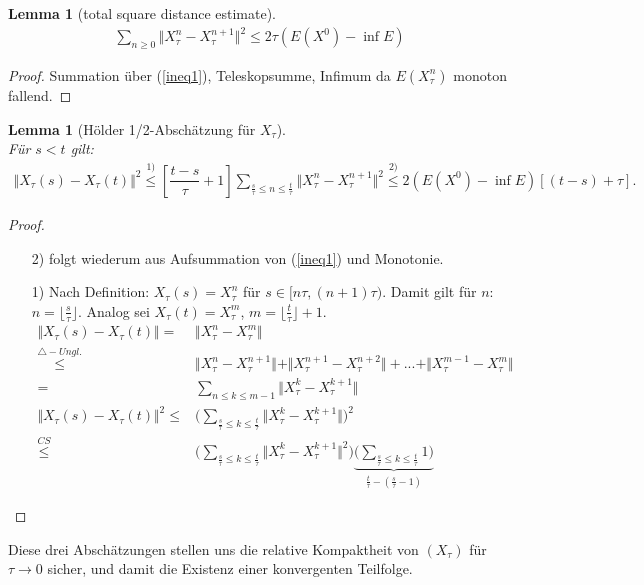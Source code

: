 \documentclass[11pt,a4paper,notitlepage]{scrreprt}
\newtheorem{lem}[defi]{Lemma}
\begin{document}
\begin{lem}[total square distance estimate]
\begin{eqnarray}
\sum_{n\geq 0}\Vert X_\tau^n-X_\tau^{n+1}\Vert^2\leq 2\tau (E(X^0)-\inf E)\label{totalsquare}
\end{eqnarray}
\end{lem}
\begin{proof}
Summation über (\ref{ineq1}), Teleskopsumme, Infimum da $E(X_\tau^n)$ monoton fallend.
\end{proof}

\begin{lem}[Hölder 1/2-Abschätzung für $X_\tau$]  $~~$ \\
Für $s<t$ gilt:
\begin{eqnarray}
\Vert X_\tau(s)-X_\tau(t)\Vert^2 \overset{1)}\leq \left[\dfrac{t-s}{\tau}+1\right] \sum_{\frac{s}{\tau}\leq n \leq \frac{t}{\tau}} \Vert X^n_\tau- X_\tau^{n+1}\Vert^2 \overset{2)}\leq 2(E(X^0)-\inf E)[(t-s)+\tau]. \label{Hölder}
\end{eqnarray}
\end{lem}

\begin{proof}
\begin{itemize}
\item[2)] folgt wiederum aus Aufsummation von (\ref{ineq1}) und Monotonie.
\item[1)] Nach Definition: $X_\tau(s)=X_\tau^n$ für $s\in [n\tau,(n+1)\tau)$. Damit gilt für $n$: $n=\lfloor \frac{s}{	\tau}\rfloor$. Analog sei $X_\tau(t)=X_\tau^m$, $m=\lfloor\frac{t}{\tau}\rfloor+1$.\\
\begin{align*}
\Vert X_\tau(s)-X_\tau(t)\Vert=&\Vert X_\tau^n-X_\tau^m\Vert \\\overset{\triangle -Ungl.}\leq&\Vert X_\tau^n-X_\tau^{n+1}\Vert+\Vert X_\tau^{n+1}-X_\tau^{n+2}\Vert+...+\Vert X_\tau^{m-1}-X_\tau^m\Vert\\
=&\sum_{n\leq k\leq m-1}\Vert X_\tau^k-X_\tau^{k+1}\Vert\\
\Vert X_\tau(s)-X_\tau(t)\Vert^2\leq&\Bigg(\sum_{\frac{s}{\tau}\leq k\leq \frac{t}{\tau}}\Vert X_\tau^k-X_\tau^{k+1}\Vert\Bigg)^2 \\ \overset{CS}\leq&\Bigg(\sum_{\frac{s}{\tau}\leq k\leq \frac{t}{\tau}}\Vert X_\tau^k-X_\tau^{k+1}\Vert^2\Bigg)\underset{\frac{t}{\tau}-(\frac{s}{\tau}-1)}{\underbrace{\Bigg(\sum_{\frac{s}{\tau}\leq k\leq \frac{t}{\tau}}1\Bigg)}}
\end{align*}
\end{itemize}
\end{proof}
Diese drei Abschätzungen stellen uns die relative Kompaktheit von $(X_\tau)$ für $\tau \to 0$ sicher, und damit die Existenz einer konvergenten Teilfolge.  \\
\end{document}
